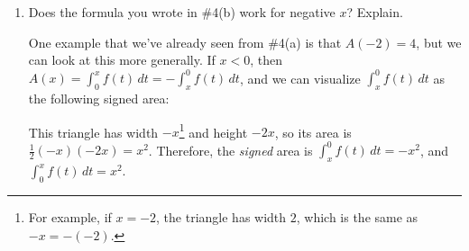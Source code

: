 \documentclass{article}
\begin{document}
\begin{enumerate}
\begin{enumerate}
    \begin{solution}
      $A(x)$ is just another way of writing $\displaystyle \int_0^x
      f(t)\,dt$.  Since we're working with $x \geq 0$, we can visualize
      this integral as the following signed area:
      \begin{center}
      \end{center}
      This is the area of a triangle of width $x$ and height $2x$, so it's
      equal to $\frac{1}{2} (x) (2x) = \boxed{x^2}$. 
    \end{solution}

  \item
\begin{problem}[\stretch{2}]
      Does the formula you wrote in {{{{\#4}}(b)}} work
      for negative $x$?  Explain. 
    \end{problem}

    \begin{solution}
        One example that we've already seen from
      {{{{\#4}}(a)}} is that $A(-2) = 4$, but we can
      look at this more generally.  If $x < 0$, then $A(x) =
      \displaystyle \int_0^x f(t)\,dt = - \int_x^0 f(t)\,dt$, and we can
      visualize $\displaystyle \int_x^0 f(t)\,dt$ as the following signed
      area:
      \begin{center}
      \end{center}
      This triangle has width $-x$\footnote{For example, if $x = -2$, the
        triangle has width $2$, which is the same as $-x = - (-2)$.} and
      height $-2x$, so its area is $\frac{1}{2} (-x)(-2x) = x^2$.
      Therefore, the \emph{signed} area is $\displaystyle \int_x^0
      f(t)\,dt = - x^2$, and $\displaystyle \int_0^x f(t)\,dt = x^2$.       
    \end{solution}


\end{enumerate}
\end{enumerate}
\end{document}
